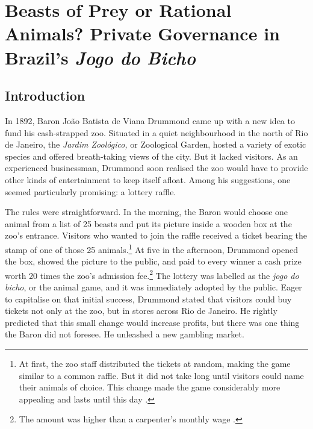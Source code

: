 \chapter{Beasts of Prey or Rational Animals? Private Governance in Brazil's \emph{Jogo do Bicho}}
\label{chap:bicho}

\section{Introduction}
\label{sec:intro3}

In 1892, Baron João Batista de Viana Drummond came up with a new idea to fund his cash-strapped zoo. Situated in a quiet neighbourhood in the north of Rio de Janeiro, the \emph{Jardim Zoológico,} or Zoological Garden, hosted a variety of exotic species and offered breath-taking views of the city. But it lacked visitors. As an experienced businessman, Drummond soon realised the zoo would have to provide other kinds of entertainment to keep itself afloat. Among his suggestions, one seemed particularly promising: a lottery raffle.

The rules were straightforward. In the morning, the Baron would choose one animal from a list of 25 beasts and put its picture inside a wooden box at the zoo's entrance. Visitors who wanted to join the raffle received a ticket bearing the stamp of one of those 25 animals.\footnote{At first, the zoo staff distributed the tickets at random, making the game similar to a common raffle. But it did not take long until visitors could name their animals of choice. This change made the game considerably more appealing and lasts until this day \citep[71--74]{da1999aguias}.} At five in the afternoon, Drummond opened the box, showed the picture to the public, and paid to every winner a cash prize worth 20 times the zoo's admission fee.\footnote{The amount was higher than a carpenter's monthly wage \citep[542]{chazkel2007beyond}.} The lottery was labelled as the \emph{jogo do bicho}, or the animal game, and it was immediately adopted by the public. Eager to capitalise on that initial success, Drummond stated that visitors could buy tickets not only at the zoo, but in stores across Rio de Janeiro. He rightly predicted that this small change would increase profits, but there was one thing the Baron did not foresee. He unleashed a new gambling market.

